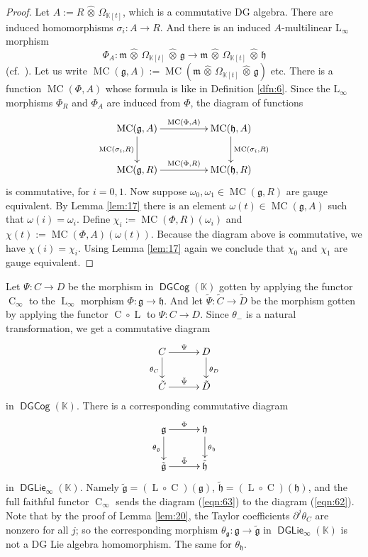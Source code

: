 \documentclass[a4paper,10pt]{amsart}
\theoremstyle{definition}
\numberwithin{equation}{section}
\newcommand{\opn}{\operatorname}
\newcommand{\cat}[1]{\operatorname{\mathsf{#1}}}
\newcommand{\mfrak}[1]{\mathfrak{#1}}
\newcommand{\mrm}[1]{\mathrm{#1}}
\newcommand{\mbb}[1]{\mathbb{#1}}
\newcommand{\til}[1]{\tilde{#1}}
\newcommand{\what}[1]{\widehat{#1}}
\newcommand{\hatotimes}{\, \what{\otimes} \,}
\newcommand{\hot}{\hatotimes}
\newcommand{\K}{\mbb{K}}
\newcommand{\g}{\mfrak{g}}
\newcommand{\m}{\mfrak{m}}
\newcommand{\h}{\mfrak{h}}
\newcommand{\sg}{\sigma}
\newcommand{\om}{\omega}
\newcommand{\Om}{\Omega}
\renewcommand{\th}{\theta}
\newcommand{\pa}{\partial}
\begin{document}
\begin{proof}
Let $A:= R \hot \Om_{\K[t]}$, which is a commutative DG algebra. There
are induced homomorphisms $\sg_i : A \to R$.
And there is an induced $A$-multilinear $\mrm{L}_{\infty}$ morphism 
\[ \Phi_{A} : \m \hot \Om_{\K[t]} \hot \g \to 
\m \hot \Om_{\K[t]} \hot \h  \]
(cf.\ \cite[Section 3]{Ye2}).
Let us write 
$\opn{MC}(\g, A) := \opn{MC}(\m \hot \Om_{\K[t]} \hot \g)$ etc.
There is a function $\opn{MC}(\Phi, A)$ whose formula is like in Definition
\ref{dfn:6}. Since the $\mrm{L}_{\infty}$ morphisms $\Phi_R$ and
$\Phi_A$ are induced from $\Phi$,
the diagram of functions 
\[ \UseTips \xymatrix @C=11ex @R=6ex {
\opn{MC}(\g, A) 
\ar[r]^{\opn{MC}(\Phi, A)}
\ar[d]_{\opn{MC}(\sg_i, R)}
&
\opn{MC}(\h, A) 
\ar[d]^{\opn{MC}(\sg_i, R)}
\\
\opn{MC}(\g, R) 
\ar[r]^{\opn{MC}(\Phi, R)}
&
\opn{MC}(\h, R) 
} \]
is commutative, for $i = 0, 1$.
Now suppose $\om_0, \om_1 \in \opn{MC}(\g, R)$ are gauge equivalent. By Lemma
\ref{lem:17} there is an element $\om(t) \in \opn{MC}(\g, A)$ such that 
$\om(i) = \om_i$. Define
$\chi_i := \opn{MC}(\Phi, R)(\om_i)$ and 
$\chi(t) := \opn{MC}(\Phi, A)(\om(t))$. 
Because the diagram above is commutative, we have
$\chi(i) = \chi_i$. Using Lemma \ref{lem:17} again we conclude that 
$\chi_0$ and $\chi_1$ are gauge equivalent.
\end{proof}

Let $\Psi : C \to D$ be the morphism in $\cat{DGCog}(\K)$ gotten by applying
the functor $\opn{C}_{\infty}$ to the $\opn{L}_{\infty}$ morphism 
$\Phi : \g  \to \h$. And let 
$\til{\Psi} : \til{C} \to \til{D}$ be the morphism gotten by applying
the functor $\opn{C} \circ \opn{L}$ to $\Psi : C \to D$. 
Since $\th_-$ is a natural transformation, we get a
commutative diagram 
\begin{equation} \label{eqn:62}
\UseTips \xymatrix @C=7ex @R=5ex {
C
\ar[r]^{\Psi}
\ar[d]_{\th_C}
&
D
\ar[d]^{\th_D}
\\
\til{C}
\ar[r]^{\til{\Psi}}
&
\til{D}
} 
\end{equation}
in $\cat{DGCog}(\K)$.
There is a corresponding commutative diagram 
\begin{equation} \label{eqn:63}
\UseTips \xymatrix @C=7ex @R=5ex {
\g
\ar[r]^{\Phi}
\ar[d]_{\th_{\g}}
&
\h
\ar[d]^{\th_{\h}}
\\
\til{\g}
\ar[r]^{\til{\Phi}}
&
\til{\h}
} 
\end{equation}
in $\cat{DGLie}_{\infty}(\K)$. Namely 
$\til{\g} = (\opn{L} \circ \opn{C})(\g)$,
$\til{\h} = (\opn{L} \circ \opn{C})(\h)$, 
and the full faithful functor $\opn{C}_{\infty}$ sends the 
diagram (\ref{eqn:63}) to the diagram (\ref{eqn:62}).
Note that by the proof of Lemma \ref{lem:20}, the Taylor coefficients
$\pa^j \th_C$ are nonzero for all $j$; so the corresponding morphism 
$\th_{\g} : \g \to \til{\g}$ in $\cat{DGLie}_{\infty}(\K)$ is not a DG Lie
algebra homomorphism. The same for $\th_{\h}$.
\end{document}
